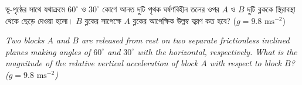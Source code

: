 \documentclass[12pt, a4paper]{article}
\begin{document}
\begin{tcolorbox}[questionbox={প্রশ্ন (Question) 18}]
    \noindent
    ভূ-পৃষ্ঠের সাথে যথাক্রমে $60^\circ$ ও $30^\circ$ কোণে আনত দুটি পৃথক ঘর্ষণবিহীন তলের ওপর $A$ ও $B$ দুটি ব্লককে স্থিরাবস্থা থেকে ছেড়ে দেওয়া হলো। $B$ ব্লকের সাপেক্ষে $A$ ব্লকের আপেক্ষিক উল্লম্ব ত্বরণ কত হবে? ($g = 9.8\text{ ms}^{-2}$)
    
    \vspace{0.8em}
    \begin{english}
    \noindent\textit{\color{darkgray}
    Two blocks $A$ and $B$ are released from rest on two separate frictionless inclined planes making angles of $60^\circ$ and $30^\circ$ with the horizontal, respectively. What is the magnitude of the relative vertical acceleration of block $A$ with respect to block $B$? ($g = 9.8\text{ ms}^{-2}$)
    }
    \end{english}
\end{tcolorbox}
\end{document}
